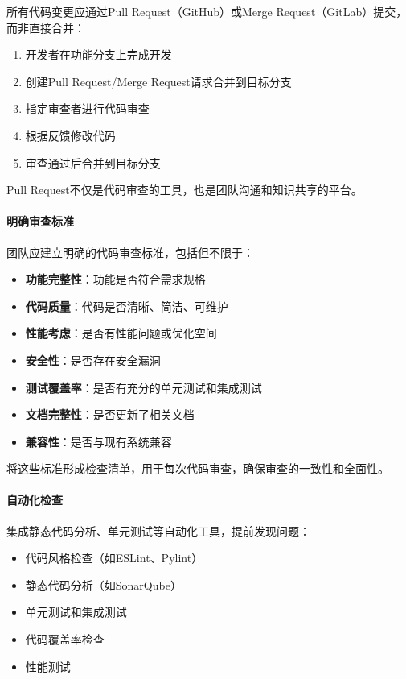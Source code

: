 所有代码变更应通过Pull Request（GitHub）或Merge
Request（GitLab）提交，而非直接合并：

\begin{enumerate}
\def\labelenumi{\arabic{enumi}.}
\tightlist
\item
  开发者在功能分支上完成开发
\item
  创建Pull Request/Merge Request请求合并到目标分支
\item
  指定审查者进行代码审查
\item
  根据反馈修改代码
\item
  审查通过后合并到目标分支
\end{enumerate}

Pull Request不仅是代码审查的工具，也是团队沟通和知识共享的平台。

\paragraph{明确审查标准}\label{ux660eux786eux5ba1ux67e5ux6807ux51c6}

团队应建立明确的代码审查标准，包括但不限于：

\begin{itemize}
\tightlist
\item
  \textbf{功能完整性}：功能是否符合需求规格
\item
  \textbf{代码质量}：代码是否清晰、简洁、可维护
\item
  \textbf{性能考虑}：是否有性能问题或优化空间
\item
  \textbf{安全性}：是否存在安全漏洞
\item
  \textbf{测试覆盖率}：是否有充分的单元测试和集成测试
\item
  \textbf{文档完整性}：是否更新了相关文档
\item
  \textbf{兼容性}：是否与现有系统兼容
\end{itemize}

将这些标准形成检查清单，用于每次代码审查，确保审查的一致性和全面性。

\paragraph{自动化检查}\label{ux81eaux52a8ux5316ux68c0ux67e5}

集成静态代码分析、单元测试等自动化工具，提前发现问题：

\begin{itemize}
\tightlist
\item
  代码风格检查（如ESLint、Pylint）
\item
  静态代码分析（如SonarQube）
\item
  单元测试和集成测试
\item
  代码覆盖率检查
\item
  性能测试
\end{itemize}

